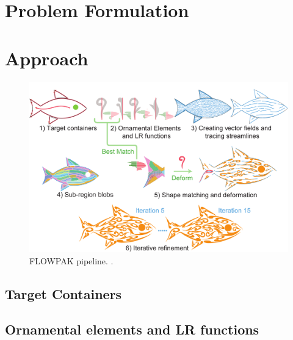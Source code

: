 \section{Problem Formulation}


\section{Approach}


\begin{figure}
\centering
\includegraphics[width=1.0\textwidth]{figures/flowpak/pipeline.pdf} 
\caption[FLOWPAK pipeline]
{\label{fig_flowpak_pipeline} 
FLOWPAK pipeline. .}
\end{figure}

\subsection{Target Containers}


\subsection{Ornamental elements and LR functions}

